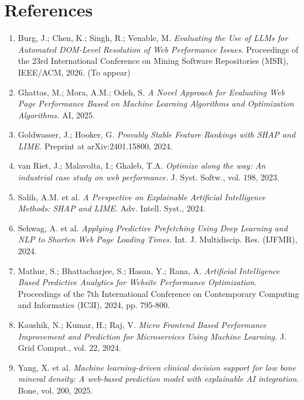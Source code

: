 \chapter{References}

\begin{enumerate}
    \item Burg, J.; Chen, K.; Singh, R.; Venable, M. \textit{Evaluating the Use of LLMs for Automated DOM-Level Resolution of Web Performance Issues.} Proceedings of the 23rd International Conference on Mining Software Repositories (MSR), IEEE/ACM, 2026. (To appear)
    
    \item Ghattas, M.; Mora, A.M.; Odeh, S. \textit{A Novel Approach for Evaluating Web Page Performance Based on Machine Learning Algorithms and Optimization Algorithms.} AI, 2025.
    
    \item Goldwasser, J.; Hooker, G. \textit{Provably Stable Feature Rankings with SHAP and LIME.} Preprint at arXiv:2401.15800, 2024.
    
    \item van Riet, J.; Malavolta, I.; Ghaleb, T.A. \textit{Optimize along the way: An industrial case study on web performance.} J. Syst. Softw., vol. 198, 2023.
    
    \item Salih, A.M. et al. \textit{A Perspective on Explainable Artificial Intelligence Methods: SHAP and LIME.} Adv. Intell. Syst., 2024.
    
    \item Sehwag, A. et al. \textit{Applying Predictive Prefetching Using Deep Learning and NLP to Shorten Web Page Loading Times.} Int. J. Multidiscip. Res. (IJFMR), 2024.
    
    \item Mathur, S.; Bhattacharjee, S.; Hasan, Y.; Rana, A. \textit{Artificial Intelligence Based Predictive Analytics for Website Performance Optimization.} Proceedings of the 7th International Conference on Contemporary Computing and Informatics (IC3I), 2024, pp. 795-800.

    \item Kaushik, N.; Kumar, H.; Raj, V. \textit{Micro Frontend Based Performance Improvement and Prediction for Microservices Using Machine Learning.} J. Grid Comput., vol. 22, 2024.
    
    \item Yang, X. et al. \textit{Machine learning-driven clinical decision support for low bone mineral density: A web-based prediction model with explainable AI integration.} Bone, vol. 200, 2025.


\end{enumerate}
